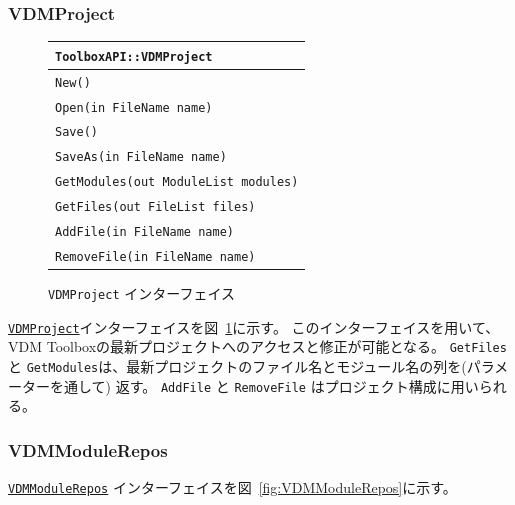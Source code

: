 \documentclass[\pformat,12pt]{jarticle}
\newcommand{\VDMModuleRepos}{\hyperlink{interface.VDMModuleRepos}{VDMModuleRepos}}
\newcommand{\VDMProject}{\hyperlink{interface.VDMProject}{VDMProject}}
\begin{document}
\subsubsection{VDMProject}


\begin{figure}[tbh]
\begin{center}
\begin{tabular}{|l|}
\hline
{\tt ToolboxAPI::VDMProject } \\
\hline
{\tt New() } \\
{\tt Open(in FileName name) } \\
{\tt Save() } \\
{\tt SaveAs(in FileName name) } \\
{\tt GetModules(out ModuleList modules)} \\
{\tt GetFiles(out FileList files)} \\
{\tt AddFile(in FileName name)} \\
{\tt RemoveFile(in FileName name)} \\
\hline
\end{tabular}
\caption{{\tt VDMProject} インターフェイス}\label{fig:VDMProject}
\end{center}
\end{figure}

 {\tt \VDMProject}インターフェイスを図~\ref{fig:VDMProject}に示す。
このインターフェイスを用いて、VDM Toolboxの最新プロジェクトへのアクセスと修正が可能となる。 
{\tt GetFiles} と {\tt GetModules}は、最新プロジェクトのファイル名とモジュール名の列を(パラメーターを通して) 返す。
{\tt  AddFile} と {\tt RemoveFile} はプロジェクト構成に用いられる。

\subsubsection{VDMModuleRepos}

{\tt \VDMModuleRepos} インターフェイスを図~\ref{fig:VDMModuleRepos}に示す。

\end{document}
